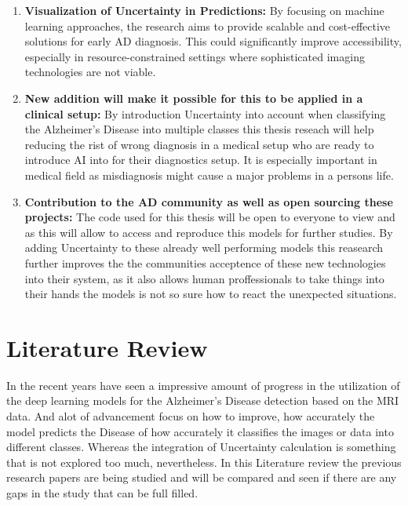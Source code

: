 \documentclass[12pt,twocolumn]{report}
\begin{document}
\begin{enumerate}
    \item \textbf{Visualization of Uncertainty in Predictions:} By focusing on machine learning approaches, the research aims to provide scalable and cost-effective solutions for early AD diagnosis. This could significantly improve accessibility, especially in resource-constrained settings where sophisticated imaging technologies are not viable.

    \item \textbf{New addition will make it possible for this to be applied in a clinical setup:} By introduction Uncertainty into account when classifying the Alzheimer’s Disease into multiple classes this thesis reseach will help reducing the rist of wrong diagnosis in a medical setup who are ready to introduce AI into for their diagnostics setup. It is especially important in medical field as misdiagnosis might cause a major problems in a persons life.

    \item \textbf{Contribution to the AD community as well as open sourcing these projects:} The code used for this thesis will be open to everyone to view and as this will allow to access and reproduce this models for further studies. By adding Uncertainty to these already well performing models this reasearch further improves the the communities acceptence of these new technologies into their system, as it also allows human proffessionals to take things into their hands the models is not so sure how to react the unexpected situations.

\end{enumerate}



\chapter{Literature Review}

In the recent years have seen a impressive amount of progress in the utilization of the deep learning models for the Alzheimer’s Disease detection based on the MRI data. And alot of advancement focus on how to improve, how accurately the model predicts the Disease of how accurately it classifies the images or data into different classes. Whereas the integration of Uncertainty calculation is something that is not explored too much, nevertheless. In this Literature review the previous research papers are being studied and will be compared and seen if there are any gaps in the study that can be full filled.
\end{document}
